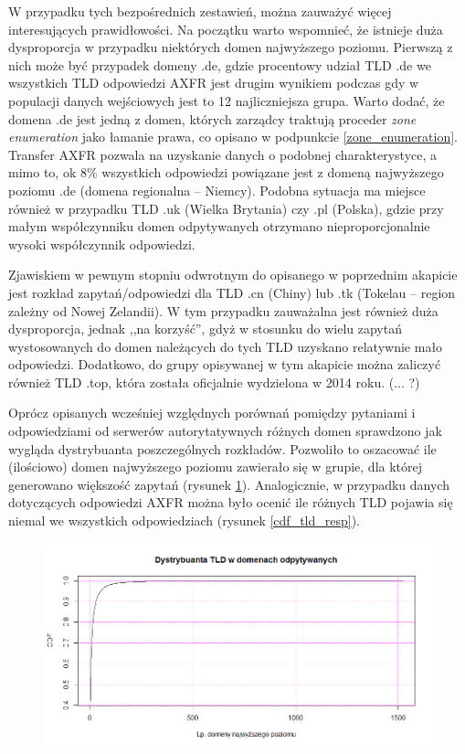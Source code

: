 W przypadku tych bezpośrednich zestawień, można zauważyć więcej interesujących prawidłowości. Na początku warto wspomnieć, że istnieje duża dysproporcja w przypadku niektórych domen najwyższego poziomu. Pierwszą z nich może być przypadek domeny .de, gdzie procentowy udział TLD .de we wszystkich TLD odpowiedzi AXFR jest drugim wynikiem podczas gdy w populacji danych wejściowych jest to 12 najliczniejsza grupa. Warto dodać, że domena .de jest jedną z domen, których zarządcy traktują proceder \textit{zone enumeration} jako łamanie prawa, co opisano w podpunkcie \ref{zone_enumeration}. Transfer AXFR pozwala na uzyskanie danych o podobnej charakterystyce, a mimo to, ok 8\% wszystkich odpowiedzi powiązane jest z domeną najwyższego poziomu .de (domena regionalna -- Niemcy). Podobna sytuacja ma miejsce również w przypadku TLD .uk (Wielka Brytania) czy .pl (Polska), gdzie przy małym współczynniku domen odpytywanych otrzymano nieproporcjonalnie wysoki współczynnik odpowiedzi.

Zjawiskiem w pewnym stopniu odwrotnym do opisanego w poprzednim akapicie jest rozkład zapytań/odpowiedzi dla TLD .cn (Chiny) lub .tk (Tokelau -- region zależny od Nowej Zelandii). W tym przypadku zauważalna jest również duża dysproporcja, jednak ,,na korzyść'', gdyż w stosunku do wielu zapytań wystosowanych do domen należących do tych TLD uzyskano relatywnie mało odpowiedzi. Dodatkowo, do grupy opisywanej w tym akapicie można zaliczyć również TLD .top, która została oficjalnie wydzielona w 2014 roku. (... ?)

Oprócz opisanych wcześniej względnych porównań pomiędzy pytaniami i odpowiedziami od serwerów autorytatywnych różnych domen sprawdzono jak wygląda dystrybuanta poszczególnych rozkładów. Pozwoliło to oszacować ile (ilościowo) domen najwyższego poziomu zawierało się w grupie, dla której generowano większość zapytań (rysunek \ref{cdf_tld_req}). Analogicznie, w przypadku danych dotyczących odpowiedzi AXFR można było ocenić ile różnych TLD pojawia się niemal we wszystkich odpowiedziach (rysunek \ref{cdf_tld_resp}).

\begin{figure}[ht]
	\centering
	\includegraphics[width=1.0\textwidth]{image/cdf_tld_req}
	\caption{}
	\label{cdf_tld_req}
\end{figure}

